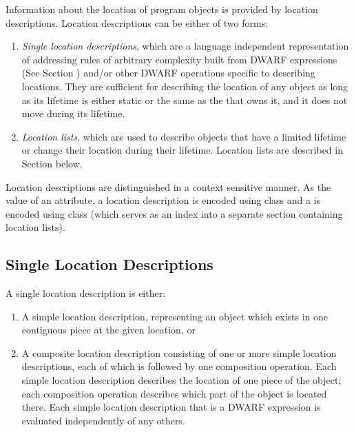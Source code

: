 Information about the location of program objects is provided
by location descriptions. Location descriptions can be either
of two forms:
\begin{enumerate}[1. ]
\item \textit{Single location descriptions}, 
which 
are 
a language independent representation of
addressing rules of arbitrary complexity built from 
DWARF expressions (See Section ) 
and/or other
DWARF operations specific to describing locations. They are
sufficient for describing the location of any object as long
as its lifetime is either static or the same as the 
 that owns it, 
and it does not move during its lifetime.


\item \textit{Location lists}, which are used to 
describe
objects that have a limited lifetime or change their location
during their lifetime. Location lists are described in
Section  below.

\end{enumerate}

Location descriptions are distinguished in a context sensitive
manner. As the value of an attribute, a location description
is encoded using class \CLASSexprloc{}
and a  is encoded
using class \CLASSloclist{} (which serves as an 
index into a separate section containing location lists).

\subsection{Single Location Descriptions}
\label{chap:singlelocationdescriptions}
A single location description is either:
\begin{enumerate}[1. ]
\item A simple location description, representing an object
which 
exists in one contiguous piece at the given location, or 
\item A composite location description consisting of one or more
simple location descriptions, each of which is followed by
one composition operation. Each simple location description
describes the location of one piece of the object; each
composition operation describes which part of the object is
located there. Each simple location description that is a
DWARF expression is evaluated independently of any others.
\end{enumerate}



